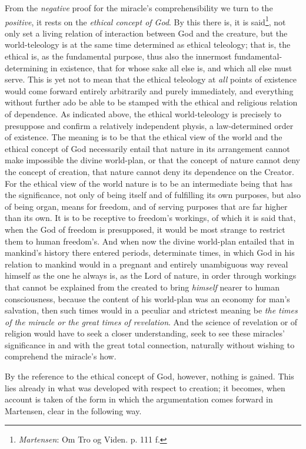 \documentclass[12pt,a4paper]{book}
\begin{document}
From the \emph{negative} proof for the miracle's comprehensibility we turn to the
\emph{positive}, it rests on the \emph{ethical concept of God}. By this there is, it is said\footnote{\emph{Martensen}:
Om Tro og Viden. p. 111 f.}, not only set a living relation of interaction between God and the
creature, but the world-teleology is at the same time determined as ethical teleology; that is,
the ethical is, as the fundamental purpose, thus also the innermost fundamental-determining in
existence, that for whose sake all else is, and which all else must serve. This is yet not to mean
that the ethical teleology at \emph{all} points of existence would come forward entirely arbitrarily and
purely immediately, and everything without further ado be able to be stamped with the ethical and
religious relation of dependence. As indicated above, the ethical world-teleology is precisely to
presuppose and confirm a relatively independent physis, a law-determined order of existence. The
meaning is to be that the ethical view of the world and the ethical concept of God necessarily
entail that nature in its arrangement cannot make impossible the divine world-plan, or that the
concept of nature cannot deny the concept of creation, that nature cannot deny its dependence on
the Creator. For the ethical view of the world nature is to be an intermediate being that has the
significance, not only of being itself and of fulfilling its own purposes, but also of being organ,
means for freedom, and of serving purposes that are far higher than its own. It is to be receptive
to freedom's workings, of which it is said that, when the God of freedom is presupposed, it would be
most strange to restrict them to human freedom's. And when now the divine world-plan entailed that
in mankind's history there entered periods, determinate times, in which God in his relation to
mankind would in a pregnant and entirely unambiguous way reveal himself as the one he always is, as
the Lord of nature, in order through workings that cannot be explained from the created to bring
\emph{himself} nearer to human consciousness, because the content of his world-plan was an economy for
man's salvation, then such times would in a peculiar and strictest meaning be \emph{the times of
the miracle or the great times of revelation}. And the science of revelation or of religion would
have to seek a closer understanding, seek to see these miracles' significance in and with the great
total connection, naturally without wishing to comprehend the miracle's how.

By the reference to the ethical concept of God, however, nothing is gained. This lies already in
what was developed with respect to creation; it becomes, when account is taken of the form in which
the argumentation comes forward in Martensen, clear in the following way.
\end{document}
